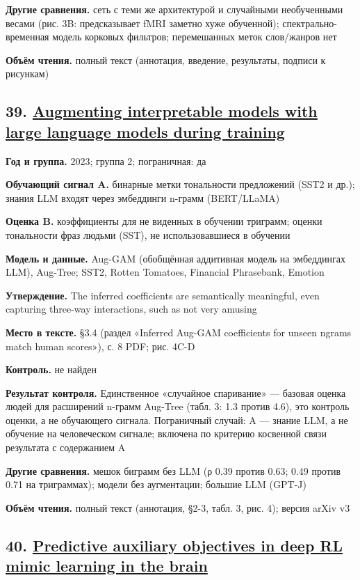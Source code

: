 \textbf{Другие сравнения.} сеть с теми же архитектурой и случайными необученными весами (рис. 3B: предсказывает fMRI заметно хуже обученной); спектрально-временная модель корковых фильтров; перемешанных меток слов/жанров нет

\textbf{Объём чтения.} полный текст (аннотация, введение, результаты, подписи к рисункам)


\subsection*{39. \href{https://doi.org/10.1038/s41467-023-43713-1}{Augmenting interpretable models with large language models during training}}

\textbf{Год и группа.} 2023; группа 2; пограничная: да

\textbf{Обучающий сигнал A.} бинарные метки тональности предложений (SST2 и др.); знания LLM входят через эмбеддинги n-грамм (BERT/LLaMA)

\textbf{Оценка B.} коэффициенты для не виденных в обучении триграмм; оценки тональности фраз людьми (SST), не использовавшиеся в обучении

\textbf{Модель и данные.} Aug-GAM (обобщённая аддитивная модель на эмбеддингах LLM), Aug-Tree; SST2, Rotten Tomatoes, Financial Phrasebank, Emotion

\textbf{Утверждение.} The inferred coefficients are semantically meaningful, even capturing three-way interactions, such as not very amusing

\textbf{Место в тексте.} §3.4 (раздел «Inferred Aug-GAM coefficients for unseen ngrams match human scores»), с. 8 PDF; рис. 4C-D

\textbf{Контроль.} не найден

\textbf{Результат контроля.} Единственное «случайное спаривание» — базовая оценка людей для расширений n-грамм Aug-Tree (табл. 3: 1.3 против 4.6), это контроль оценки, а не обучающего сигнала. Пограничный случай: A — знание LLM, а не обучение на человеческом сигнале; включена по критерию косвенной связи результата с содержанием A

\textbf{Другие сравнения.} мешок биграмм без LLM (ρ 0.39 против 0.63; 0.49 против 0.71 на триграммах); модели без аугментации; большие LLM (GPT-J)

\textbf{Объём чтения.} полный текст (аннотация, §2-3, табл. 3, рис. 4); версия arXiv v3


\subsection*{40. \href{https://doi.org/10.48550/arxiv.2310.06089}{Predictive auxiliary objectives in deep RL mimic learning in the brain}}


